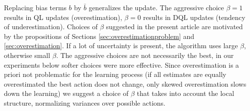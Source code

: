\documentclass{article}
\theoremstyle{plain}
\theoremstyle{definition}
\theoremstyle{remark}
\begin{document}
Replacing bias terms $b$ by $\bar b$ generalizes the update. The aggressive choice $\beta=1$ results in QL updates (overestimation), $\beta=0$ results in DQL updates (tendency of underestimation). Choices of $\beta$ suggested in the present article are motivated by the propositions of Sections \ref{sec:overestimationproblem} and \ref{sec:overestimation}. If a lot of uncertainty is present, the algorithm uses large $\beta$, otherwise small $\beta$. The aggressive choices are not necessarily the best, in our experiments below softer choices were more effective. Since overestimation is a priori not problematic for the learning process (if all estimates are equally overestimated the best action does not change, only skewed overestimation slows down the learning) we suggest a choice of $\beta$ that takes into account the local structure, normalizing variances over possible actions.
 
\end{document}

